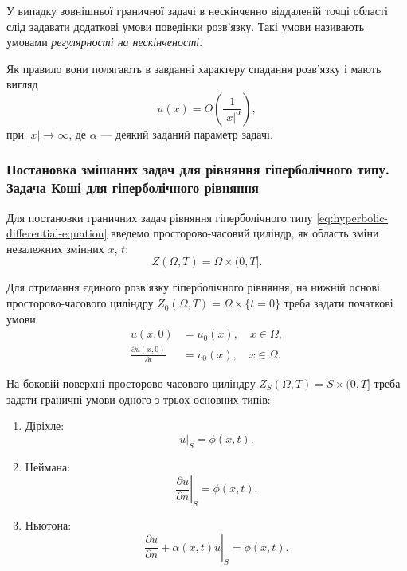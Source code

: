 \begin{definition}
    У випадку зовнішньої граничної задачі в нескінченно віддаленій точці області слід задавати додаткові умови поведінки розв'язку. Такі умови називають умовами \textit{регулярності на нескінченості}.
\end{definition}

\begin{remark}
    Як правило вони полягають в завданні характеру спадання розв'язку і мають вигляд
    \begin{equation}
        u(x) = O \left( \frac{1}{|x|^\alpha} \right),
    \end{equation}
    при $|x| \to \infty$, де $\alpha$ --- деякий заданий параметр задачі.
\end{remark}

\subsubsection{Постановка змішаних задач для рівняння гіперболічного типу. Задача Коші для гіперболічного рівняння}

Для постановки граничних задач рівняння гіперболічного типу \eqref{eq:hyperbolic-differential-equation} введемо просторово-часовий циліндр, як область зміни незалежних змінних $x$, $t$:
\begin{equation}
    Z(\Omega, T) = \Omega \times (0, T].
\end{equation}

Для отримання єдиного розв'язку гіперболічного рівняння, на нижній основі просторово-часового циліндру $Z_0(\Omega, T) = \Omega \times \{t = 0\}$ треба задати початкові умови:
\begin{align}
    \label{eq:hyperbolic-starting-function-condition}
    u(x, 0) &= u_0(x), \quad x \in \Omega, \\
    \label{eq:hyperbolic-starting-derivative-condition}
    \frac{\partial u(x, 0)}{\partial t} &= v_0(x), \quad x \in \Omega.
\end{align}

На боковій поверхні просторово-часового циліндру $Z_S(\Omega, T) = S \times (0, T]$ треба задати граничні умови одного з трьох основних типів:
\begin{enumerate}
    \item Діріхле:
    \begin{equation}
        \label{eq:hyperbolic-dirichlet-boundary-conditions}
        \left. u \right|_S = \phi(x, t).
    \end{equation}
    \item Неймана:
    \begin{equation}
        \label{eq:hyperbolic-neumann-boundary-conditions}
        \left. \frac{\partial u}{\partial n} \right|_S = \phi(x, t).
    \end{equation}
    \item Ньютона:
    \begin{equation}
        \label{eq:hyperbolic-newton-boundary-conditions}
        \left. \frac{\partial u}{\partial n} + \alpha(x, t) u \right|_S = \phi(x, t).
    \end{equation}
\end{enumerate}

